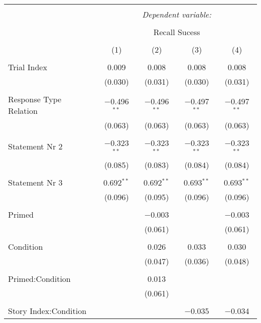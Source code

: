 
\begin{table}[!htbp] \centering
  \caption{}
  \label{table:main}
  \small
  \renewcommand{\arraystretch}{0.6}

\begin{tabular}{@{\extracolsep{5pt}}lcccc}
\\[-1.8ex]\hline
\hline \\[-1.8ex]
 & \multicolumn{4}{c}{\textit{Dependent variable:}} \\
\cline{2-5}
\\[-1.8ex] & \multicolumn{4}{c}{Recall Sucess} \\
\\[-1.8ex] & (1) & (2) & (3) & (4)\\
\hline \\[-1.8ex]
 Trial Index & 0.009 & 0.008 & 0.008 & 0.008 \\
  & (0.030) & (0.031) & (0.030) & (0.031) \\
  & & & & \\
 Response Type Relation & $-$0.496$^{**}$ & $-$0.496$^{**}$ & $-$0.497$^{**}$ & $-$0.497$^{**}$ \\
  & (0.063) & (0.063) & (0.063) & (0.063) \\
  & & & & \\
 Statement Nr 2 & $-$0.323$^{**}$ & $-$0.323$^{**}$ & $-$0.323$^{**}$ & $-$0.323$^{**}$ \\
  & (0.085) & (0.083) & (0.084) & (0.084) \\
  & & & & \\
 Statement Nr 3 & 0.692$^{**}$ & 0.692$^{**}$ & 0.693$^{**}$ & 0.693$^{**}$ \\
  & (0.096) & (0.095) & (0.096) & (0.096) \\
  & & & & \\
 Primed &  & $-$0.003 &  & $-$0.003 \\
  &  & (0.061) &  & (0.061) \\
  & & & & \\
 Condition &  & 0.026 & 0.033 & 0.030 \\
  &  & (0.047) & (0.036) & (0.048) \\
  & & & & \\
 Primed:Condition &  & 0.013 &  &  \\
  &  & (0.061) &  &  \\
  & & & & \\
 Story Index:Condition &  &  & $-$0.035 & $-$0.034 \\

\end{tabular}
\end{table}
